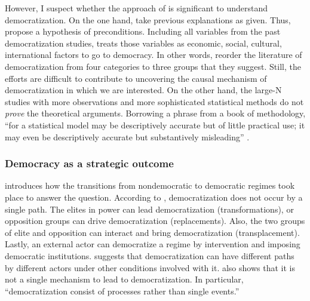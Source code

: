 \documentclass[11pt]{article}
\begin{document}
However, I suspect whether the approach of \citet{Bergschlosser2007ch2} is significant to understand democratization. On the one hand, \citet{Bergschlosser2007ch2} take previous explanations as given. Thus, \citet{Bergschlosser2007ch2} propose a hypothesis of preconditions. Including all variables from the past democratization studies, \citet{Bergschlosser2007ch2} treats those variables as economic, social, cultural, international factors to go to democracy. In other words, \citet{Bergschlosser2007ch2} reorder the literature of democratization from four categories to three groups that they suggest. Still, the efforts are difficult to contribute to uncovering the causal mechanism of democratization in which we are interested. On the other hand, the large-N studies with more observations and more sophisticated statistical methods do not \emph{prove} the theoretical arguments. Borrowing a phrase from a book of methodology, ``for a statistical model may be descriptively accurate but of little practical use; it may even be descriptively accurate but substantively misleading'' \citep[4]{Fox2016}.

\subsubsection*{Democracy as a strategic outcome}

\citet{Huntington1993} introduces how the transitions from nondemocratic to democratic regimes took place to answer the question. According to \citet{Huntington1993}, democratization does not occur by a single path. The elites in power can lead democratization (transformations), or opposition groups can drive democratization (replacements). Also, the two groups of elite and opposition can interact and bring democratization (transplacement). Lastly, an external actor can democratize a regime by intervention and imposing democratic institutions. \citet{Huntington1993} suggests that democratization can
have different paths by different actors under other conditions involved with it. \citet[797]{Treisman2020} also shows that it is not a single mechanism to lead to democratization. In particular, ``democratization consist of processes rather than single events.''
\end{document}

